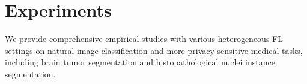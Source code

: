 \documentclass[letterpaper]{article} %
\newcommand{\cmark}{\ding{51}}%
\newcommand{\xmark}{\ding{55}}%
\begin{document}
\section{Experiments}
We provide comprehensive empirical studies with various heterogeneous FL settings on natural image classification and more privacy-sensitive medical tasks, including brain tumor segmentation and histopathological nuclei instance segmentation. 


\end{document}
